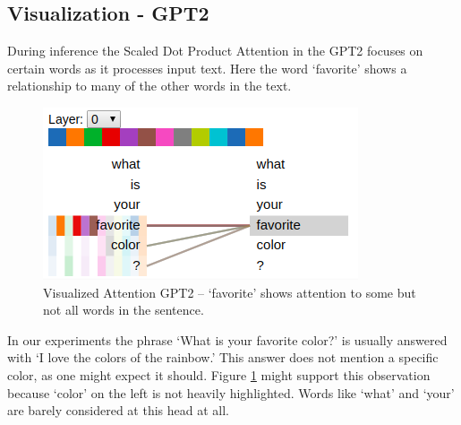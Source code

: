 \subsection{Visualization - GPT2}

During inference the Scaled Dot Product Attention in the GPT2 focuses on certain words as it processes input text. Here the word `favorite' shows a relationship to many of the other words in the text.  

\begin{figure}[H]
	\begin{center}
		\includegraphics[scale=2]{Figure_4}
		
		
	\end{center}
	\caption[Visualized Attention GPT2]{Visualized Attention GPT2 -- `favorite' shows attention to some but not all words in the sentence.}
	\label{diagram-vis04}
	
\end{figure}

In our experiments the phrase `What is your favorite color?' is usually answered with `I love the colors of the rainbow.' This answer does not mention a specific color, as one might expect it should. Figure \ref{diagram-vis04} might support this observation because `color' on the left is not heavily highlighted. Words like `what' and `your' are barely considered at this head at all. 

